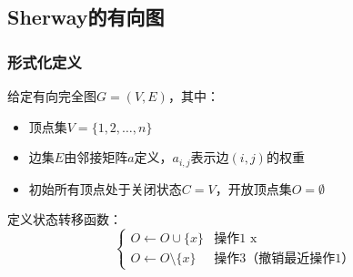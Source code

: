 \documentclass[../mainReport.tex]{subfiles} %
\begin{document}






\subsection{Sherway的有向图}
\subsubsection{形式化定义}

给定有向完全图$G=(V,E)$，其中：
\begin{itemize}
\item 顶点集$V=\{1,2,\ldots,n\}$
\item 边集$E$由邻接矩阵$a$定义，$a_{i,j}$表示边$(i,j)$的权重
\item 初始所有顶点处于关闭状态$C=V$，开放顶点集$O=\emptyset$
\end{itemize}

定义状态转移函数：
$$
\begin{cases}
O \leftarrow O \cup \{x\} & \text{操作1 x} \\
O \leftarrow O \setminus \{x\} & \text{操作3（撤销最近操作1）}
\end{cases}
$$
\end{document}
